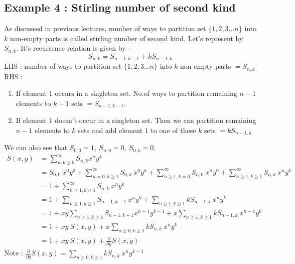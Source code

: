 \subsection{Example 4 : Stirling number of second kind} 
As discussed in previous lectures, number of ways to partition set $\{1, 2, 3 \dots n \}$ into $k$ non-empty parts is called stirling number of second kind. Let's represent by $S_{n,k}$. It's recurrence relation is given by -  
$$S_{n, k} = S_{n-1, k-1} + k S_{n-1, k} $$
LHS : number of ways to partition set $\{1, 2, 3 \dots n \}$ into $k$ non-empty parts $ = S_{n, k}$ \\
RHS : \begin{enumerate}
\item If element $1$ occurs in a singleton set. No.of ways to partition remaining $n-1$ elements to $k-1$ sets $= S_{n-1, k-1}$.
\item If element $1$ doesn't occur in a singleton set. Then we can partition remaining $n-1$ elements to $k$ sets and add element $1$ to one of these $k$ sets $=  k S_{n-1, k}$
\end{enumerate}
We can also see that $S_{0,0} = 1 ,~ S_{n, 0} = 0 ,~ S_{0, k} = 0$.
\begin{align*}
 S(x, y) &= {\sum_{n, k \geq 0} ^ {\infty} S_{n,k} x^n y^k} \\
&= S_{0,0}~x^0y^0 + {\sum_{n = 0, k \geq 1}^ {\infty} S_{0,k}~x^0y^k} + {\sum_{n \geq 1, k = 0}^ {\infty} S_{n,0}~x^n y^0} + {\sum_{n \geq 1, k \geq 1}^ {\infty} S_{n,k}~x^n y^k}  \\
 &= 1 + \sum_{n \geq 1 , k \geq 1} ^ {\infty} S_{n,k} ~ x^n y^k  \\
 &= 1 + \sum_{n \geq 1 , k \geq 1} S_{n-1, k-1}~ x^n y^k + \sum_{n \geq 1, k \geq 1} k S_{n-1, k}~ x^n y^k \\
 &= 1 + xy \sum_{n \geq 1, k \geq 1} S_{n-1, k-1} x^{n-1} y^{k-1} + x\sum_{n \geq 1, k \geq 1} k S_{n-1, k}~ x^{n-1} y^k \\
 &= 1 + xy~ S(x, y) + x \sum_{n \geq 0, k \geq 1} k S_{n, k}~ x^{n} y^k \\
 &= 1 + xy~ S(x, y) + \frac{\partial}{\partial y} S(x,y)
\end{align*}
Note : $\frac{\partial}{\partial y} S(x, y) = \sum_{n \geq 0, k \geq 1} k S_{n,k}~x^n y^{k-1}$ 


